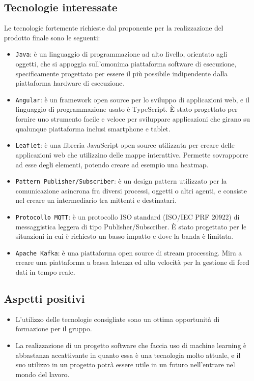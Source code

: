 \subsection{Tecnologie interessate}
Le tecnologie fortemente richieste dal proponente per la realizzazione del prodotto finale sono le seguenti:
\begin{itemize}
    \item \verb|Java|: è un linguaggio di programmazione ad alto livello, orientato agli oggetti, che si appoggia sull'omonima piattaforma software di esecuzione, specificamente progettato per essere il più possibile indipendente dalla piattaforma hardware di esecuzione.
    \item \verb|Angular|: è un framework open source per lo sviluppo di applicazioni web, e il linguaggio di programmazione usato è TypeScript. È stato progettato per fornire uno strumento facile e veloce per sviluppare applicazioni che girano su qualunque piattaforma inclusi smartphone e tablet.
    \item \verb|Leaflet|: è una libreria JavaScript open source utilizzata per creare delle applicazioni web che utilizzino delle mappe interattive. Permette sovrapporre ad esse degli elementi, potendo creare ad esempio una heatmap.
    \item \verb|Pattern Publisher/Subscriber|: è un design pattern utilizzato per la comunicazione asincrona fra diversi processi, oggetti o altri agenti, e consiste nel creare un intermediario tra mittenti e destinatari.
    \item \verb|Protocollo MQTT|: è un protocollo ISO standard (ISO/IEC PRF 20922) di messaggistica leggera di tipo Publisher/Subscriber. È stato progettato per le situazioni in cui è richiesto un basso impatto e dove la banda è limitata.
    \item \verb|Apache Kafka|: è una piattaforma open source di stream processing. Mira a creare una piattaforma a bassa latenza ed alta velocità per la gestione di feed dati in tempo reale.
\end{itemize}

\subsection{Aspetti positivi}
\begin{itemize}
    \item L’utilizzo delle tecnologie consigliate sono un ottima opportunità di formazione per il gruppo.
    \item La realizzazione di un progetto software che faccia uso di machine learning è abbastanza accattivante in quanto essa è una tecnologia molto attuale, e il suo utilizzo in un progetto potrà essere utile in un futuro nell’entrare nel mondo del lavoro.
\end{itemize}

